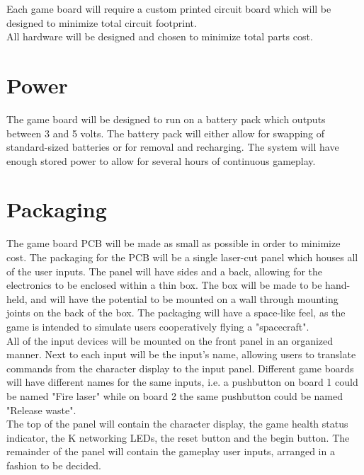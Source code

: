 \documentclass[aps,letterpaper,10pt]{revtex4}
\begin{document}
Each game board will require a custom printed circuit board which will be designed to minimize total circuit footprint. \\

All hardware will be designed and chosen to minimize total parts cost.\\
 

\section{Power}

The game board will be designed to run on a battery pack which outputs between 3 and 5 volts. The battery pack will either allow for swapping of standard-sized batteries or for removal and recharging. The system will have enough stored power to allow for several hours of continuous gameplay. \\

\section{Packaging}

The game board PCB will be made as small as possible in order to minimize cost. The packaging for the PCB will be a single laser-cut panel which houses all of the user inputs. The panel will have sides and a back, allowing for the electronics to be enclosed within a thin box. The box will be made to be hand-held, and will have the potential to be mounted on a wall through mounting joints on the back of the box. The packaging will have a space-like feel, as the game is intended to simulate users cooperatively flying a "spacecraft". \\

All of the input devices will be mounted on the front panel in an organized manner. Next to each input will be the input's name, allowing users to translate commands from the character display to the input panel. Different game boards will have different names for the same inputs, i.e. a pushbutton on board 1 could be named "Fire laser" while on board 2 the same pushbutton could be named "Release waste". \\

The top of the panel will contain the character display, the game health status indicator, the K networking LEDs, the reset button and the begin button. The remainder of the panel will contain the gameplay user inputs, arranged in a fashion to be decided. \\
\end{document}
